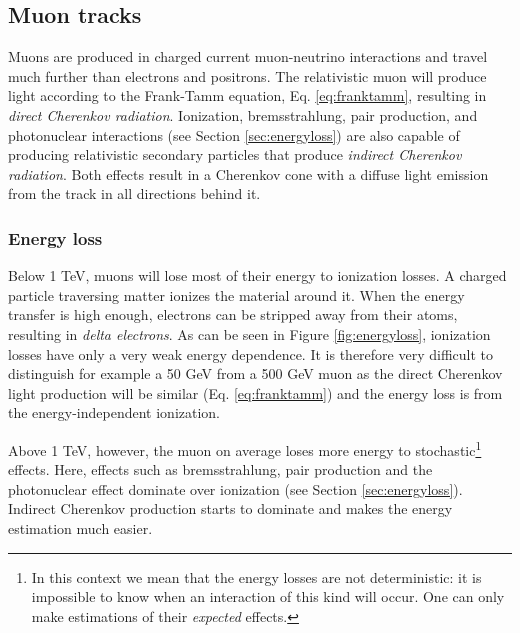 \subsection{Muon tracks}
Muons are produced in charged current muon-neutrino interactions and travel much further than electrons and positrons. The relativistic muon will produce light according to the Frank-Tamm equation, Eq. \ref{eq:franktamm}, resulting in \textit{direct Cherenkov radiation}. Ionization, bremsstrahlung, pair production, and photonuclear interactions (see Section \ref{sec:energyloss}) are also capable of producing relativistic secondary particles that produce \textit{indirect Cherenkov radiation}. Both effects result in a Cherenkov cone with a diffuse light emission from the track in all directions behind it. 

\subsubsection{Energy loss}
\label{subsub:energyloss}
Below 1 TeV, muons will lose most of their energy to ionization losses. A charged particle traversing matter ionizes the material around it. When the energy transfer is high enough, electrons can be stripped away from their atoms, resulting in \textit{delta electrons}. As can be seen in Figure \ref{fig:energyloss}, ionization losses have only a very weak energy dependence. It is therefore very difficult to distinguish for example a 50 GeV from a 500 GeV muon as the direct Cherenkov light production will be similar (Eq. \ref{eq:franktamm}) and the energy loss is from the energy-independent ionization.

Above 1 TeV, however, the muon on average loses more energy to stochastic\footnote{In this context we mean that the energy losses are not deterministic: it is impossible to know when an interaction of this kind will occur. One can only make estimations of their \textit{expected} effects.} effects. Here, effects such as bremsstrahlung, pair production and the photonuclear effect dominate over ionization (see Section \ref{sec:energyloss}). Indirect Cherenkov production starts to dominate and makes the energy estimation much easier.\\

